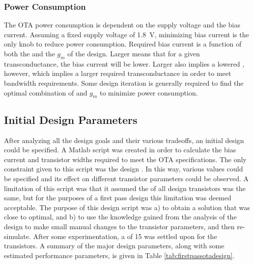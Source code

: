 \subsubsection{Power Consumption}
The OTA power consumption is dependent on the supply voltage and the bias current. Assuming a fixed supply voltage of \SI{1.8}{\volt}, minimizing bias current is the only knob to reduce power consumption. Required bias current is a function of both the \gmid\spc and the $g_{m}$ of the design. Larger \gmid\spc means that for a given transconductance, the bias current will be lower. Larger \gmid\spc also implies a lowered \transit, however, which implies a larger required transconductance in order to meet bandwidth requirements. Some design iteration is generally required to find the optimal combination of \gmid\spc and $g_{m}$ to minimize power consumption.
\subsection{Initial Design Parameters}
After analyzing all the design goals and their various tradeoffs, an initial design could be specified. A Matlab script was created in order to calculate the bias current and transistor widths required to meet the OTA specifications. The only constraint given to this script was the design \gmid. In this way, various \gmid\spc values could be specified and its effect on different transistor parameters could be observed. A limitation of this script was that it assumed the \gmid\spc of all design transistors was the same, but for the purposes of a first pass design this limitation was deemed acceptable. The purpose of this design script was a) to obtain a solution that was close to optimal, and b) to use the knowledge gained from the analysis of the design to make small manual changes to the transistor parameters, and then re-simulate. After some experimentation, a \gmid\spc of 15 was settled upon for the transistors. A summary of the major design parameters, along with some estimated performance parameters, is given in Table \ref{tab:firstpassotadesign}. 
